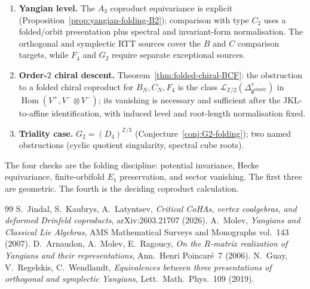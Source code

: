 \documentclass[11pt]{amsart}
\theoremstyle{definition}
\theoremstyle{remark}
\providecommand{\fg}{\mathfrak{g}}
\begin{document}
\begin{enumerate}[label=\textup{(\arabic*)}]
\item \textbf{Yangian level.} The $A_3$ coproduct equivariance is
  explicit (Proposition~\ref{prop:yangian-folding-B2}); comparison
  with type $C_2$ uses a folded/orbit presentation plus spectral and
  invariant-form normalisation. The orthogonal and symplectic RTT
  sources cover the $B$ and $C$ comparison targets, while $F_4$ and
  $G_2$ require separate exceptional sources.
\item \textbf{Order-$2$ chiral descent.}
  Theorem~\ref{thm:folded-chiral-BCF}: the obstruction to a folded
  chiral coproduct for $B_N, C_N, F_4$ is the class
  $\mathcal L_{\mathbb Z/2}(\Delta^v_{\fg^{\mathrm{simply}}})$ in
  $\operatorname{Hom}(V^+,V^-\otimes V^-)$; its vanishing is necessary
  and sufficient after the JKL-to-affine identification, with induced
  level and root-length normalisation fixed.
\item \textbf{Triality case.} $G_2 = (D_4)^{\mathbb{Z}/3}$
  (Conjecture~\ref{conj:G2-folding}); two named obstructions
  (cyclic quotient singularity, spectral cube roots).
\end{enumerate}

The four checks are the folding discipline: potential invariance,
Hecke equivariance, finite-orbifold $E_1$ preservation, and sector
vanishing. The first three are geometric. The fourth is the deciding
coproduct calculation.

\begin{thebibliography}{99}
 S.~Jindal, S.~Kaubrys, A.~Latyntsev,
\emph{Critical CoHAs, vertex coalgebras, and deformed Drinfeld
coproducts}, arXiv:2603.21707 (2026).
 A.~Molev,
\emph{Yangians and Classical Lie Algebras}, AMS Mathematical Surveys
and Monographs vol.~143 (2007).
 D.~Arnaudon, A.~Molev, E.~Ragoucy,
\emph{On the $R$-matrix realization of Yangians and their
representations}, Ann.\ Henri Poincar\'e~7 (2006).
 N.~Guay, V.~Regelskis, C.~Wendlandt,
\emph{Equivalences between three presentations of orthogonal and
symplectic Yangians}, Lett.\ Math.\ Phys.\ 109 (2019).
\end{thebibliography}
\end{document}
